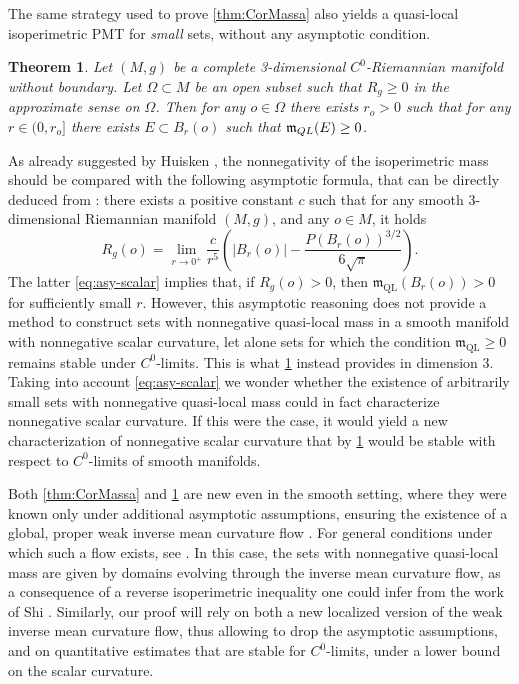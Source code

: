 \documentclass[a4paper,12pt,reqno]{amsart}
\numberwithin{equation}{section}
\theoremstyle{plain}
\newtheorem{theorem}{Theorem}[section]
\theoremstyle{definition}
\theoremstyle{remark}
\newcommand{\abs}[1]{\left\lvert#1\right\rvert}
\begin{document}
\smallskip

The same strategy used to prove \cref{thm:CorMassa} also yields a quasi-local isoperimetric PMT for \emph{small} sets, without any asymptotic condition.

\begin{theorem}
\label{thm:small}
Let $(M,g)$ be a complete 3-dimensional $C^0$-Riemannian manifold without boundary. Let $\Omega \subset M$ be an open subset such that $R_g\ge0$ in the approximate sense on $\Omega$.
Then for any $o \in \Omega$ there exists $r_o>0$ such that for any $r \in (0,r_o]$ there exists $E \subset B_r(o)$ such that $\mathfrak{m}_{\rm QL}(E) \ge 0$.
\end{theorem}


As already suggested by Huisken \cite{Huisken2}, the nonnegativity of the isoperimetric mass should be compared with the following asymptotic formula, that can be directly deduced from \cite[Theorem 3.1]{gray}: there exists a positive constant $c$ such that for any smooth $3$-dimensional Riemannian manifold $(M, g)$, and any $o \in M$, it holds 
\begin{equation}
\label{eq:asy-scalar}
{R_g}(o) =  \lim_{r \to 0^+} \frac{c}{r^{5}} \left(\abs{B_r(o)} - \frac{P(B_r(o))^{3/2}}{6\sqrt{\pi}} \right).
\end{equation}
The latter \eqref{eq:asy-scalar} implies that, if ${R}_g(o) > 0$, then $\mathfrak{m}_{\mathrm{QL}} (B_r(o)) > 0$ for sufficiently small $r$. However, this asymptotic reasoning does not provide a method to construct sets with nonnegative quasi-local mass in a smooth manifold with nonnegative scalar curvature, let alone sets {for which the condition $\mathfrak{m}_{\mathrm{QL}} \geq 0$ remains stable} under $C^0$-limits. This is what \cref{thm:small} instead provides in dimension $3$. Taking into account \eqref{eq:asy-scalar} 
we wonder whether the existence of arbitrarily small sets with nonnegative quasi-local mass could in fact characterize nonnegative scalar curvature. If this were the case, it would yield a new characterization of nonnegative scalar curvature that by \cref{thm:small} would be stable with respect to $C^0$-limits of smooth manifolds.

Both \cref{thm:CorMassa} and \cref{thm:small} are new even in the smooth setting, where they were known only under additional asymptotic assumptions, ensuring the existence of a global, proper weak inverse mean curvature flow \cite{HuiskenIlmanen}. For general conditions under which such a flow exists, see \cite{KaiXu}.
In this case, the sets with nonnegative quasi-local mass are given by domains evolving through the inverse mean curvature flow, as a consequence of a reverse isoperimetric inequality one could infer from the work of Shi \cite{Shi}. Similarly, our proof will rely on both a new localized version of the weak inverse mean curvature flow, thus allowing to drop the asymptotic assumptions, and on quantitative estimates that are stable for $C^0$-limits, under a lower bound on the scalar curvature. 
\smallskip
\end{document}

